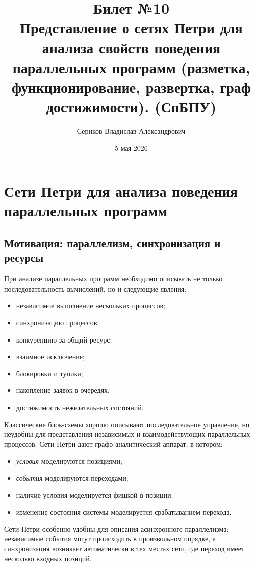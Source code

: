 \documentclass[12pt,a4paper]{article}
\title{Билет №10 \\ \small Представление о сетях Петри для анализа свойств поведения параллельных программ (разметка, функционирование, развертка, граф достижимости).  (СпБПУ)}
\author{Сериков Владислав Александрович}
\date{5 мая 2026}
\begin{document}
\maketitle
\tableofcontents
\newpage

\section{Сети Петри для анализа поведения параллельных программ}

\subsection{Мотивация: параллелизм, синхронизация и ресурсы}

При анализе параллельных программ необходимо описывать не только последовательность вычислений, но и следующие явления:
\begin{itemize}
    \item независимое выполнение нескольких процессов;
    \item синхронизацию процессов;
    \item конкуренцию за общий ресурс;
    \item взаимное исключение;
    \item блокировки и тупики;
    \item накопление заявок в очередях;
    \item достижимость нежелательных состояний.
\end{itemize}

Классические блок-схемы хорошо описывают последовательное управление, но неудобны для представления независимых и взаимодействующих параллельных процессов. Сети Петри дают графо-аналитический аппарат, в котором:
\begin{itemize}
    \item \emph{условия} моделируются позициями;
    \item \emph{события} моделируются переходами;
    \item наличие условия моделируется фишкой в позиции;
    \item изменение состояния системы моделируется срабатыванием перехода.
\end{itemize}

Сети Петри особенно удобны для описания асинхронного параллелизма: независимые события могут происходить в произвольном порядке, а синхронизация возникает автоматически в тех местах сети, где переход имеет несколько входных позиций.
\end{document}
